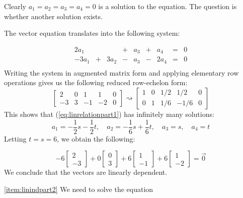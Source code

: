 \documentclass{ximera}
\begin{document}
\begin{example}
\begin{explanation}
 Clearly $a_1=a_2=a_3=a_4=0$ is a solution to the equation.  The question is whether another solution exists.
 
The vector equation translates into the following system:

$$\begin{array}{ccccccccc}
      2a_1 & &&+&a_3&+&a_4&= &0 \\
        -3a_1& +&3a_2&-&a_3&-&2a_4&= &0 \\
      \end{array}$$
  Writing the system in augmented matrix form and applying elementary row operations gives us the following reduced row-echelon form:
  $$\left[\begin{array}{cccc|c}  
 2&0&1&1&0\\-3&3&-1&-2&0
 \end{array}\right]\rightsquigarrow\left[\begin{array}{cccc|c}  
 1&0&1/2&1/2&0\\0&1&1/6&-1/6&0
 \end{array}\right]$$
 This shows that (\ref{eq:linrelationpart1}) has infinitely many solutions:  
 $$a_1=-\frac{1}{2}s-\frac{1}{2}t,\quad a_2=-\frac{1}{6}s+\frac{1}{6}t,\quad a_3=s,\quad a_4=t$$
 Letting $t=s=6$, we obtain the following:
 
 $$-6\begin{bmatrix}2\\-3\end{bmatrix}+0 \begin{bmatrix}0\\3\end{bmatrix}+6\begin{bmatrix}1\\-1\end{bmatrix}+6\begin{bmatrix}1\\-2\end{bmatrix}=\vec{0}$$
 We conclude that the vectors are linearly dependent.
 
 \ref{item:linindpart2} We need to solve the equation
 

\end{explanation}
\end{example}
\end{document}
